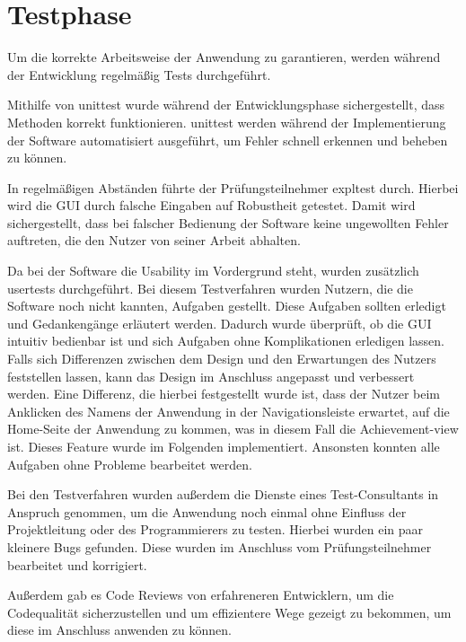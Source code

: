 \documentclass[11pt]{article}
\begin{document}
%
%

\section{Testphase}

Um die korrekte Arbeitsweise der Anwendung zu garantieren, werden während der Entwicklung regelmäßig Tests durchgeführt.

Mithilfe von \gls{unittest} wurde während der Entwicklungsphase sichergestellt, dass Methoden korrekt funktionieren.
\gls{unittest} werden während der Implementierung der Software automatisiert ausgeführt, um Fehler schnell erkennen und beheben 
zu können.

In regelmäßigen Abständen führte der Prüfungsteilnehmer \gls{expltest} durch. Hierbei wird die GUI durch falsche
Eingaben auf Robustheit getestet. Damit wird sichergestellt, dass bei falscher Bedienung der Software keine ungewollten
Fehler auftreten, die den Nutzer von seiner Arbeit abhalten. 

Da bei der Software die Usability im Vordergrund steht, wurden zusätzlich \glspl{usertest} durchgeführt. Bei diesem Testverfahren wurden Nutzern, die
die Software noch nicht kannten, Aufgaben gestellt. Diese Aufgaben sollten erledigt und Gedankengänge erläutert werden. Dadurch wurde überprüft, 
ob die GUI intuitiv bedienbar ist und sich Aufgaben ohne Komplikationen erledigen lassen. Falls sich Differenzen zwischen dem Design und den Erwartungen des Nutzers
feststellen lassen, kann das Design im Anschluss angepasst und verbessert werden.
Eine Differenz, die hierbei festgestellt wurde ist, dass der Nutzer beim Anklicken des Namens der Anwendung in der Navigationsleiste erwartet, auf die
Home-Seite der Anwendung zu kommen, was in diesem Fall die Achievement-\Gls{view} ist. Dieses Feature wurde im Folgenden implementiert.
Ansonsten konnten alle Aufgaben ohne Probleme bearbeitet werden.

Bei den Testverfahren wurden außerdem die Dienste eines Test-Consultants in Anspruch genommen, um die Anwendung noch einmal
ohne Einfluss der Projektleitung oder des Programmierers zu testen. Hierbei wurden ein paar kleinere Bugs gefunden.
Diese wurden im Anschluss vom Prüfungsteilnehmer bearbeitet und korrigiert.

Außerdem gab es Code Reviews von erfahreneren Entwicklern, um die Codequalität sicherzustellen und um effizientere Wege gezeigt zu bekommen,
um diese im Anschluss anwenden zu können.
\end{document}
